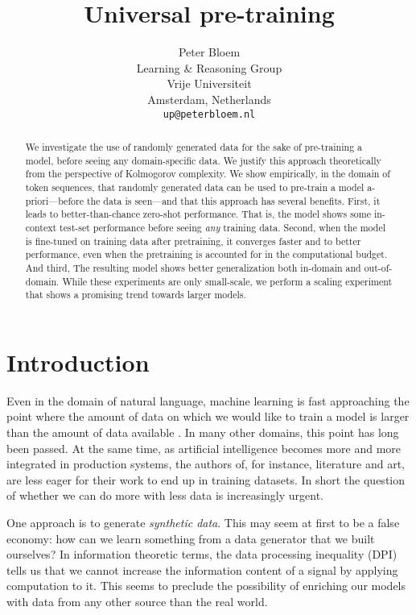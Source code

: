 \documentclass{article} %
\title{Universal pre-training}
\author{Peter Bloem \\
Learning \& Reasoning Group\\
Vrije Universiteit \\
Amsterdam, Netherlands \\
\texttt{up@peterbloem.nl} \\
}
\begin{document}
\maketitle

\begin{abstract}
We investigate the use of randomly generated data for the sake of pre-training a model, before seeing any domain-specific data. We justify this approach theoretically from the perspective of Kolmogorov complexity. We show empirically, in the domain of token sequences, that randomly generated data can be used to pre-train a model a-priori---before the data is seen---and that this approach has several benefits. First, it leads to better-than-chance zero-shot performance. That is, the model shows some in-context test-set performance before seeing \emph{any} training data. Second, when the model is fine-tuned on training data after pretraining, it converges faster and to better performance, even when the pretraining is accounted for in the computational budget. And third, The resulting model shows better generalization both in-domain and out-of-domain. While these experiments are only small-scale, we perform a scaling experiment that shows a promising trend towards larger models.
\end{abstract}

\section{Introduction}

Even in the domain of natural language, machine learning is fast approaching the point where the amount of data on which we would like to train a model is larger than the amount of data available \cite{}. In many other domains, this point has long been passed. At the same time, as artificial intelligence becomes more and more integrated in production systems, the authors of, for instance, literature and art, are less eager for their work to end up in training datasets. In short the question of whether we can do more with less data is increasingly urgent.

One approach is to generate \emph{synthetic data}. This may seem at first to be a false economy: how can we learn something from a data generator that we built ourselves? In information theoretic terms, the data processing inequality (DPI) \cite{} tells us that we cannot increase the information content of a signal by applying computation to it. This seems to preclude the possibility of enriching our models with data from any other source than the real world.
\end{document}
